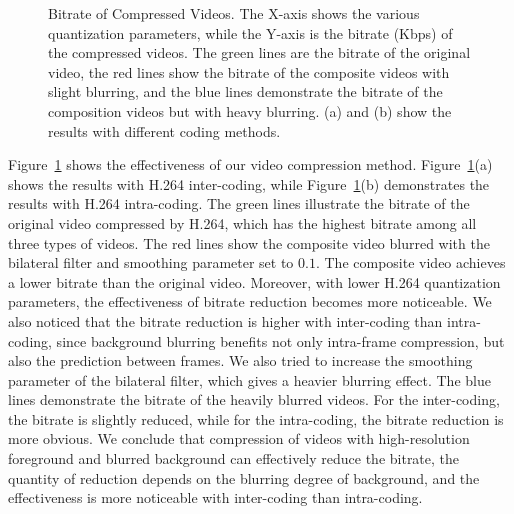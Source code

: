 \begin{figure}
	\centering
	\caption{Bitrate of Compressed Videos. The X-axis shows the various quantization parameters, while the Y-axis is the bitrate (Kbps) of the compressed videos. The green lines are the bitrate of the original video, the red lines show the bitrate of the composite videos with slight blurring, and the blue lines demonstrate the bitrate of the composition videos but with heavy blurring. (a) and (b) show the results with different coding methods.} 
	\label{fig-comp-br}
\end{figure}

Figure~\ref{fig-comp-br} shows the effectiveness of our video compression method. Figure~\ref{fig-comp-br}(a) shows the results with H.264 inter-coding, while Figure~\ref{fig-comp-br}(b) demonstrates the results with H.264 intra-coding. The green lines illustrate the bitrate of the original video compressed by H.264, which has the highest bitrate among all three types of videos. The red lines show the composite video blurred with the bilateral filter and smoothing parameter set to $0.1$. The composite video achieves a lower bitrate than the original video. Moreover, with lower H.264 quantization parameters, the effectiveness of bitrate reduction becomes more noticeable. We also noticed that the bitrate reduction is higher with inter-coding than intra-coding, since background blurring benefits not only intra-frame compression, but also the prediction between frames. We also tried to increase the smoothing parameter of the bilateral filter, which gives a heavier blurring effect. The blue lines demonstrate the bitrate of the heavily blurred videos. For the inter-coding, the bitrate is slightly reduced, while for the intra-coding, the bitrate reduction is more obvious. We conclude that compression of videos with high-resolution foreground and blurred background can effectively reduce the bitrate, the quantity of reduction depends on the blurring degree of background, and the effectiveness is more noticeable with inter-coding than intra-coding.
